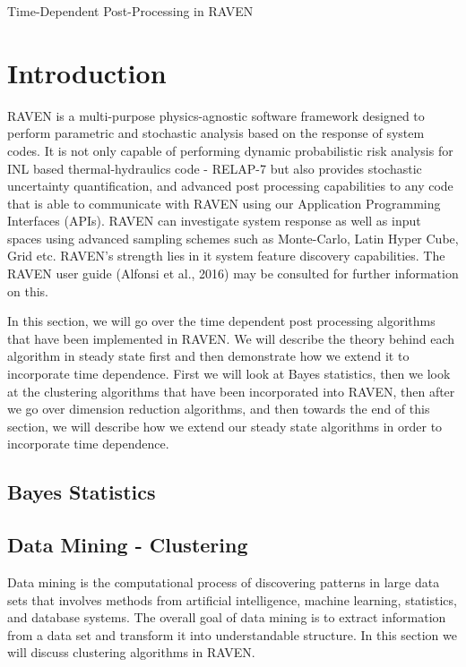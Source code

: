 \documentclass[11pt]{article}
\begin{document}
\begin{center}
\begin{Huge}

Time-Dependent Post-Processing in RAVEN

\end{Huge}
\end{center}

\section{Introduction}

RAVEN is a multi-purpose physics-agnostic software framework designed to perform parametric and stochastic analysis based on the response of system codes. It is not only capable of performing dynamic probabilistic risk analysis for INL based thermal-hydraulics code - RELAP-7 but also provides stochastic uncertainty quantification, and advanced post processing capabilities to any code that is able to communicate with RAVEN using our Application Programming Interfaces (APIs). RAVEN can investigate system response as well as input spaces using advanced sampling schemes such as Monte-Carlo, Latin Hyper Cube, Grid etc. RAVEN's strength lies in it system feature discovery capabilities. The RAVEN user guide (Alfonsi et al., 2016) may be consulted for further information on this.

In this section, we will go over the time dependent post processing algorithms that have been implemented in RAVEN. We will describe the theory behind each algorithm in steady state first and then demonstrate how we extend it to incorporate time dependence. First we will look at Bayes statistics, then we look at the clustering algorithms that have been incorporated into RAVEN, then after we go over dimension reduction algorithms, and then towards the end of this section, we will describe how we extend our steady state algorithms in order to incorporate time dependence.  

\subsection{Bayes Statistics}

\subsection{Data Mining - Clustering}

Data mining is the computational process of discovering patterns in large data sets that involves methods from artificial intelligence, machine learning, statistics, and database systems. The overall goal of data mining is to extract information from a data set and transform it into understandable structure. In this section we will discuss clustering algorithms in RAVEN. 
\end{document}
